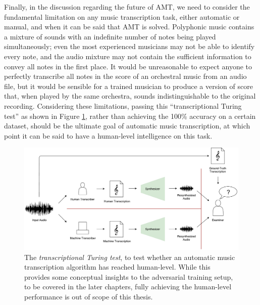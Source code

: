 Finally, in the discussion regarding the future of AMT, we need to consider the fundamental limitation on any music transcription task, either automatic or manual, and when it can be said that AMT is solved.
Polyphonic music contains a mixture of sounds with an indefinite number of notes being played simultaneously; even the most experienced musicians may not be able to identify every note, and the audio mixture may not contain the sufficient information to convey all notes in the first place.
It would be unreasonable to expect anyone to perfectly transcribe all notes in the score of an orchestral music from an audio file, but it would be sensible for a trained musician to produce a version of score that, when played by the same orchestra, sounds indistinguishable to the original recording.
Considering these limitations, passing this ``transcriptional Turing test'' as shown in Figure \ref{fig:turing}, rather than achieving the 100\% accuracy on a certain dataset, should be the ultimate goal of automatic music transcription, at which point it can be said to have a human-level intelligence on this task.

\begin{figure}
	\includegraphics[width=\textwidth]{turing.pdf}
	\caption{The \emph{transcriptional Turing test}, to test whether an automatic music transcription algorithm has reached human-level. While this provides some conceptual insights to the adversarial training setup, to be covered in the later chapters, fully achieving the human-level performance is out of scope of this thesis.}
	\label{fig:turing}
\end{figure}


\pagebreak